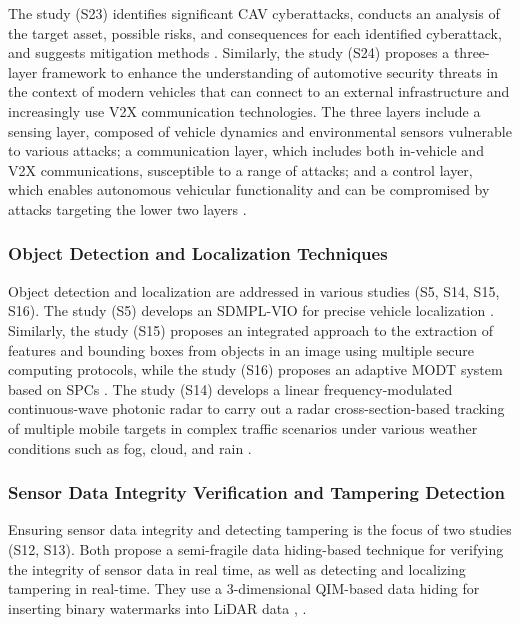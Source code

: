 \documentclass[a4paper,12pt]{article}
\begin{document}
The study (S23) identifies significant CAV cyberattacks, conducts an analysis of the target asset, possible risks, and consequences for each identified cyberattack, and suggests mitigation methods \cite{s23}. Similarly, the study (S24) proposes a three-layer framework to enhance the understanding of automotive security threats in the context of modern vehicles that can connect to an external infrastructure and increasingly use V2X communication technologies. The three layers include a sensing layer, composed of vehicle dynamics and environmental sensors vulnerable to various attacks; a communication layer, which includes both in-vehicle and V2X communications, susceptible to a range of attacks; and a control layer, which enables autonomous vehicular functionality and can be compromised by attacks targeting the lower two layers \cite{s24}.

\subsubsection{Object Detection and Localization Techniques}
\hspace{5mm} Object detection and localization are addressed in various studies (S5, S14, S15, S16). The study (S5) develops an SDMPL-VIO for precise vehicle localization \cite{s5}. Similarly, the study (S15) proposes an integrated approach to the extraction of features and bounding boxes from objects in an image using multiple secure computing protocols, while the study (S16) proposes an adaptive MODT system based on SPCs \cite{s15}. The study (S14) develops a linear frequency-modulated continuous-wave photonic radar to carry out a radar cross-section-based tracking of multiple mobile targets in complex traffic scenarios under various weather conditions such as fog, cloud, and rain \cite{s14}.

\subsubsection{Sensor Data Integrity Verification and Tampering Detection}
\hspace{5mm} Ensuring sensor data integrity and detecting tampering is the focus of two studies (S12, S13). Both propose a semi-fragile data hiding-based technique for verifying the integrity of sensor data in real time, as well as detecting and localizing tampering in real-time. They use a 3-dimensional QIM-based data hiding for inserting binary watermarks into LiDAR data \cite{s12}, \cite{s13}.
\end{document}

